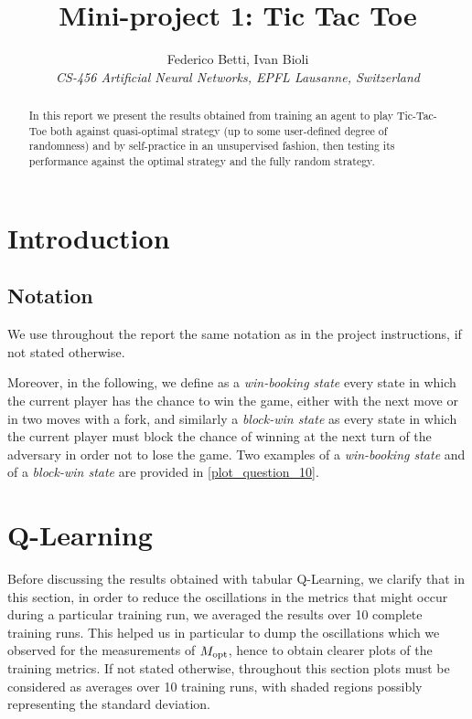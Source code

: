 \documentclass[10pt]{IEEEtran}
\begin{document}
\title{Mini-project 1: Tic Tac Toe}

\author{
   Federico Betti, Ivan Bioli\\
  \textit{CS-456 Artificial Neural Networks, EPFL Lausanne, Switzerland}
}


\maketitle

\begin{abstract}
In this report we present the results obtained from training an agent to play Tic-Tac-Toe both against quasi-optimal strategy (up to some user-defined degree of randomness) and by self-practice in an unsupervised fashion, then testing its performance against the optimal strategy and the fully random strategy. 
\end{abstract}

\section{Introduction}
\subsection{Notation}
We use throughout the report the same notation as in the project instructions, if not stated otherwise.

Moreover, in the following, we define as a \emph{win-booking state} every state in which the current player has the chance to win the game, either with the next move or in two moves with a fork, and similarly a \emph{block-win state} as every state in which the current player must block the chance of winning at the next turn of the adversary in order not to lose the game. Two examples of a \emph{win-booking state} and of a \emph{block-win state} are provided in \cref{plot_question_10}.

\section{Q-Learning}
Before discussing the results obtained with tabular Q-Learning, we clarify that in this section, in order to reduce the oscillations in the metrics that might occur during a particular training run, we averaged the results over 10 complete training runs. This helped us in particular to dump the oscillations which we observed for the measurements of $M_{\text{opt}}$, hence to obtain clearer plots of the training metrics. If not stated otherwise, throughout this section plots must be considered as averages over 10 training runs, with shaded regions possibly representing the standard deviation.
\end{document}
